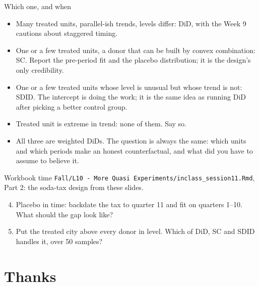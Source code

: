 \documentclass[aspectratio=169,11pt]{beamer}
\begin{document}
\begin{frame}{Which one, and when}
\begin{itemize}
	\item \alert{Many treated units, parallel-ish trends, levels differ}: DiD, with the Week 9 cautions about
	staggered timing.
	\medskip
	\item \alert{One or a few treated units, a donor that can be built by convex combination}: SC. Report the
	pre-period fit and the placebo distribution; it is the design's only credibility.
	\medskip
	\item \alert{One or a few treated units whose level is unusual but whose trend is not}: SDID. The intercept
	is doing the work; it is the same idea as running DiD after picking a better control group.
	\medskip
	\item \alert{Treated unit is extreme in trend}: none of them. Say so.
	\medskip
	\item All three are weighted DiDs. The question is always the same: which units and which periods make an
	honest counterfactual, and what did you have to assume to believe it.
\end{itemize}
\end{frame}

\begin{frame}{Workbook time}
\texttt{Fall/L10 - More Quasi Experiments/inclass\_session11.Rmd}, Part 2: the soda-tax design from these slides.
\begin{enumerate}
	\setcounter{enumi}{3}
	\item Placebo in time: backdate the tax to quarter 11 and fit on quarters 1--10. What should the gap look like?
	\item Put the treated city above every donor in level. Which of DiD, SC and SDID handles it, over 50 samples?
\end{enumerate}
\end{frame}

\section{Thanks}
\end{document}
